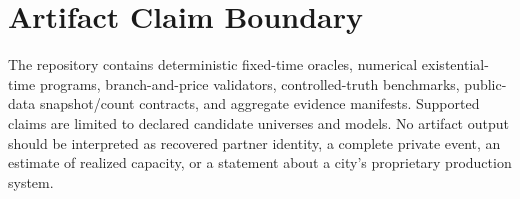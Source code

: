 \section{Artifact Claim Boundary}
The repository contains deterministic fixed-time oracles, numerical
existential-time programs, branch-and-price validators, controlled-truth
benchmarks, public-data snapshot/count contracts, and aggregate evidence
manifests. Supported claims are limited to declared candidate universes and
models. No artifact output should be interpreted as recovered partner identity,
a complete private event, an estimate of realized capacity, or a statement
about a city's proprietary production system.

